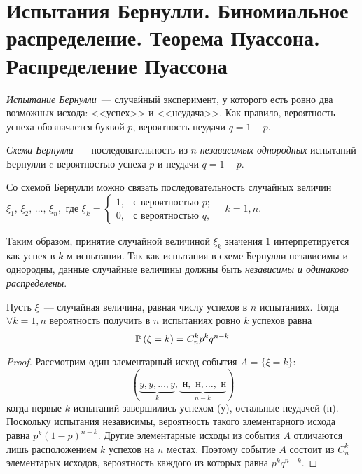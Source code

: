 \section{Испытания Бернулли. Биномиальное распределение. Теорема Пуассона. Распределение Пуассона}
\begin{defn}
    \textit{Испытание Бернулли}~--- случайный эксперимент, у которого есть ровно два возможных 
    исхода: <<успех>> и <<неудача>>. 
    Как правило, вероятность успеха обозначается буквой $p$, вероятность неудачи $q = 1 - p$.
\end{defn}

\begin{defn}
    \textit{Схема Бернулли}~--- последовательность из $n$ \textit{независимых однородных} испытаний Бернулли c вероятностью успеха $p$ и неудачи $q = 1 - p$.
\end{defn}

Со схемой Бернулли можно связать последовательность случайных величин $\xi_1,\, \xi_2,\, \ldots,\, \xi_n,$ где 
$\xi_k = 
    \begin{cases} 
        1, &\text{с вероятностью } p; \\ 
        0, & \text{с вероятностью } q,
    \end{cases} 
    \quad k = \overline{1, n}$.

Таким образом, принятие случайной величиной $\xi_k$ значения $1$ интерпретируется как успех в $k$-м испытании.
Так как испытания в схеме Бернулли независимы и однородны, данные случайные величины должны быть \textit{независимы и одинаково распределены}.

\begin{namedthm}
    Пусть $\xi$~--- случайная величина, равная числу успехов в $n$ испытаниях. Тогда $\forall k = \overline{1,n}$ вероятность получить в $n$ испытаниях ровно $k$ успехов равна
    \begin{equation*}
        \operatorname{\mathbb{P}}\left(\xi=k\right)=C_{n}^{k} p^{k} q^{n-k}
    \end{equation*}
    \end{namedthm}
    
    \begin{proof}
    Рассмотрим один элементарный исход события $A = \{\xi = k \}$:
    \begin{equation*}
        (\underbrace{y, y, \ldots, y}_{k}, \underbrace{\textit{ н}, \textit{ н}, \ldots,\textit{ н}}_{n-k})
    \end{equation*}
    когда первые $k$ испытаний завершились успехом (у), остальные неудачей (н). Поскольку испытания независимы, вероятность такого элементарного исхода равна $p^k(1 - p)^{n-k}.$ Другие элементарные исходы из события $A$ отличаются лишь расположением $k$ успехов на $n$ местах. Поэтому событие $A$ состоит из $C_n^k$ элементарых исходов, вероятность каждого из которых равна $p^kq^{n-k}$.
    \end{proof}
    
